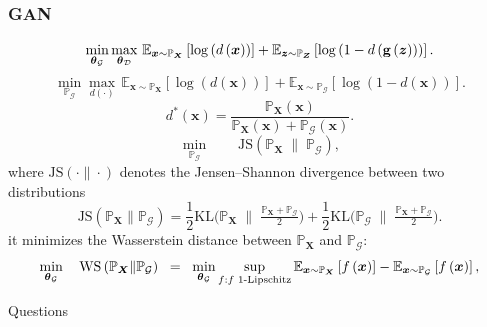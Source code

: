 \documentclass[presentation]{beamer}
\begin{document}
\begin{frame}
    \frametitle{GAN}
        
    
    \begin{equation}
        \min_{\text{\boldmath $\theta$}_{\mathcal{G}}}\max_{\text{\boldmath $\theta$}_{\mathcal{D}}}
        \,\mathbb{E}_{\bm{x}\sim\mathbb{P}_{\bm{X}}}\left[\log
        \left(d\left(\bm{x}\right)\right)\right]
        +\mathbb{E}_{\bm{z}\sim\mathbb{P}_{\bm{Z}}}\left[\log\left(1-d\left(\mathrm{\bf g}\left(\bm{z}\right)\right)\right)\right].\label{eq:GAN-original}
    \end{equation}
    \pause
    \begin{equation}\label{eq:GAN-new}
        \min_{\mathbb{P}_{\mathcal{G}}}\max_{d(\cdot)}\,\mathbb{E}_{\bm{x}\sim\mathbb{P}_{\bm{X}}}\left[\log\left(d\left(\bm{x}\right)\right)\right]+\mathbb{E}_{\bm{x}\sim\mathbb{P}_{\mathcal{G}}}\left[\log\left(1-d\left(\bm{x}\right)\right)\right].
    \end{equation}
    \pause
    \begin{equation}
        d^{*}\left(\bm{x}\right)=\frac{\mathbb{P}_{\bm{X}}\left(\bm{x}\right)}{\mathbb{P}_{\bm{X}}\left(\bm{x}\right)+\mathbb{P}_{\mathcal{G}}\left(\bm{x}\right)}.
    \end{equation}
    \pause
    \begin{equation}
        \min_{\mathbb{P}_{\mathcal{G}}}\qquad\text{JS}\left(\mathbb{P}_{\bm{X}}\;\|\;\mathbb{P}_{\mathcal{G}}\right)\label{eq:JS-min},
    \end{equation}
    where $\text{JS}(\cdot\|\cdot)$ denotes the Jensen--Shannon divergence
    between two distributions
    \begin{equation}
        \text{JS}\left(\mathbb{P}_{\bm{X}}\|\mathbb{P}_{\mathcal{G}}\right)=\frac{1}{2}\text{KL}\big(\mathbb{P}_{\bm{X}}\;\|\;\tfrac{\mathbb{P}_{\bm{X}}+\mathbb{P}_{\mathcal{G}}}{2}\big)+\frac{1}{2}\text{KL}\big(\mathbb{P}_{\mathcal{G}}\;\|\;\tfrac{\mathbb{P}_{\bm{X}}+\mathbb{P}_{\mathcal{G}}}{2}\big).
    \end{equation}
    it minimizes
    the Wasserstein distance between $\mathbb{P}_{\bm{X}}$ and $\mathbb{P}_{\mathcal{G}}$:
    \begin{equation}
        \min_{\text{\boldmath $\theta$}_{\mathcal{G}}}\quad \text{WS}\left(\mathbb{P}_{\bm{X}}\|\mathbb{P}_{\mathcal{G}}\right)\;\;=\;\;\min_{\text{\boldmath $\theta$}_{\mathcal{G}}}\sup_{f:f\text{ 1-Lipschitz}}\mathbb{E}_{\bm{x}\sim\mathbb{P}_{\bm{X}}}
        \left[f\left(\bm{x}\right)\right]-\mathbb{E}_{\bm{x}\sim
        \mathbb{P}_{\mathcal{G}}}\left[f\left(\bm{x}\right)\right],\label{eq:WS-GAN}
    \end{equation}

\end{frame}

\begin{frame}[standout]
    Questions
\end{frame}
\end{document}

